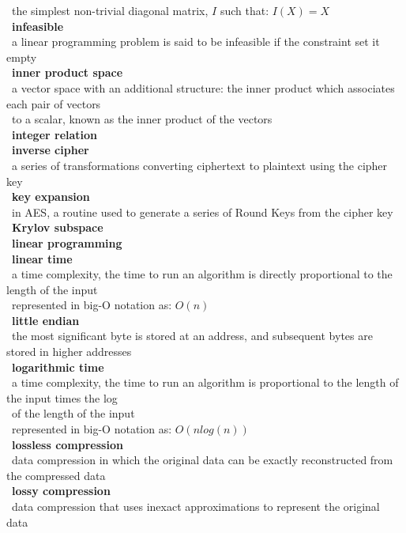 \documentclass[10pt,letterpaper]{scrartcl}
\newcommand{\tbul}{\textbullet}
\newcommand{\tend}{\>\textendash}
\begin{document}
\begin{tabbing}
\tend\ the simplest non-trivial diagonal matrix, $I$ such that: $I(X)=X$ \\
\tbul\ \textbf{infeasible} \\
\tend\ a linear programming problem is said to be infeasible if the constraint set it empty \\
\tbul\ \textbf{inner product space} \\
\tend\ a vector space with an additional structure: the inner product which associates each pair of vectors \\ \>\ to a scalar, known as the inner product of the vectors \\
\tbul\ \textbf{integer relation} \\
\tbul\ \textbf{inverse cipher} \\
\tend\ a series of transformations converting ciphertext to plaintext using the cipher key \\
\tbul\ \textbf{key expansion} \\
\tend\ in AES, a routine used to generate a series of Round Keys from the cipher key \\
\tbul\ \textbf{Krylov subspace} \\
\tbul\ \textbf{linear programming} \\ 
\tbul\ \textbf{linear time} \\
\tend\ a time complexity, the time to run an algorithm is directly proportional to the length of the input \\
\tend\ represented in big-O notation as: $O(n)$ \\
\tbul\ \textbf{little endian} \\
\tend\ the most significant byte is stored at an address, and subsequent bytes are stored in higher addresses\\
\tbul\ \textbf{logarithmic time} \\
\tend\ a time complexity, the time to run an algorithm is proportional to the length of the input times the log \\ \>\ of the length of the input \\
\tend\ represented in big-O notation as: $O(nlog(n))$ \\
\tbul\ \textbf{lossless compression} \\ 
\tend\ data compression in which the original data can be exactly reconstructed from the compressed data \\
\tbul\ \textbf{lossy compression} \\ 
\tend\ data compression that uses inexact approximations to represent the original data \\

\end{tabbing}
\end{document}
